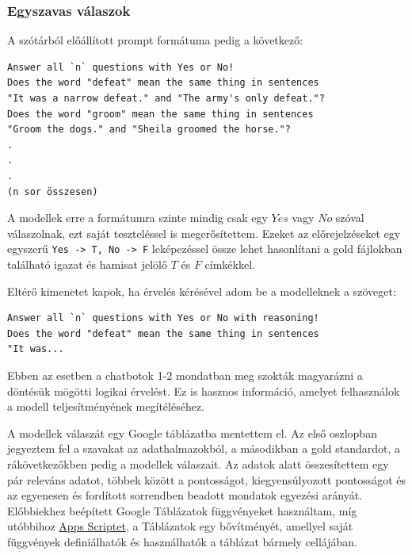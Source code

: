 \documentclass[12pt]{report}
\theoremstyle{definition}
\begin{document}
\subsubsection{Egyszavas válaszok}
A szótárból előállított prompt formátuma pedig a következő:
\begin{verbatim}
Answer all `n` questions with Yes or No!
Does the word "defeat" mean the same thing in sentences
"It was a narrow defeat." and "The army's only defeat."?
Does the word "groom" mean the same thing in sentences
"Groom the dogs." and "Sheila groomed the horse."?
.
.
.
(n sor összesen)
\end{verbatim}

A modellek erre a formátumra szinte mindig csak egy $Yes$ vagy $No$ szóval válaszolnak, ezt saját teszteléssel is megerősítettem. Ezeket az előrejelzéseket egy egyszerű \texttt{Yes -> T, No -> F} leképezéssel össze lehet hasonlítani a gold fájlokban található igazat és hamisat jelölő $T$ és $F$ címkékkel.


Eltérő kimenetet kapok, ha érvelés kérésével adom be a modelleknek a szöveget:
\begin{verbatim}
Answer all `n` questions with Yes or No with reasoning!
Does the word "defeat" mean the same thing in sentences
"It was...
\end{verbatim}

Ebben az esetben a chatbotok 1-2 mondatban meg szokták magyarázni a döntésük mögötti logikai érvelést. Ez is hasznos információ, amelyet felhasználok a modell teljesítményének megítéléséhez.

\vspace*{1cm}
A modellek válaszát egy Google táblázatba mentettem el. Az első oszlopban jegyeztem fel a szavakat az adathalmazokból, a másodikban a gold standardot, a rákövetkezőkben pedig a modellek válaszait. Az adatok alatt összesítettem egy pár releváns adatot, többek között a pontosságot, kiegyensúlyozott pontosságot és az egyenesen és fordított sorrendben beadott mondatok egyezési arányát. Előbbiekhez beépített Google Táblázatok függvényeket használtam, míg utóbbihoz \href{https://script.google.com/home/}{Apps Scriptet}, a Táblázatok egy bővítményét, amellyel saját függvények definiálhatók és használhatók a táblázat bármely cellájában.
\end{document}

